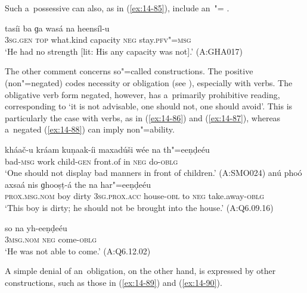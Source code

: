Such a~possessive  can also, as in (\ref{ex:14-85}), include an~"= .

\begin{exe}
\ex
\label{ex:14-85}
\gll tasíi ba ɡa wasá na heensíl-u \\
\textsc{3sg.gen} \textsc{top} what.kind capacity \textsc{neg} stay.\textsc{pfv"=msg } \\
\glt `He had no strength [lit: His any capacity was not].' (A:GHA017)
\end{exe}

The other comment concerns so"=called  constructions. The positive (non"=negated)  codes necessity or obligation (see ), especially with  verbs. The obligative verb form negated, however, has a~primarily prohibitive reading, corresponding to `it is not advisable, one should not, one should avoid'. This is particularly the case with  verbs, as in (\ref{ex:14-86}) and (\ref{ex:14-87}), whereas a~negated   (\ref{ex:14-88}) can imply non"=ability.

\ea
\label{ex:14-86}
\gll kháač-u kráam kuṇaak-íi maxadúši wée na  th"=eeṇḍeéu \\
bad-\textsc{msg} work child-\textsc{gen} front.of in \textsc{neg} do-\textsc{oblg } \\
\glt `One should not display bad manners in front of children.' (A:SMO024) 
\ex
\label{ex:14-87}
\gll anú phoó axsaá nis ɡhooṣṭ-á the na har"=eeṇḍeéu\\
\textsc{prox.msg.nom} boy dirty \textsc{3sg.prox.acc} house-\textsc{obl} to \textsc{neg} take.away-\textsc{oblg}\\
\glt `This boy is dirty; he should not be brought into the house.' (A:Q6.09.16)

\ex
\label{ex:14-88}
\gll so na yh-eeṇḍeéu\\
\textsc{3msg}.\textsc{nom} \textsc{neg} come-\textsc{oblg}\\
\glt `He was not able to come.' (A:Q6.12.02)
\z

A simple denial of an~obligation, on the other hand, is expressed by other constructions, such as those in (\ref{ex:14-89}) and (\ref{ex:14-90}).

